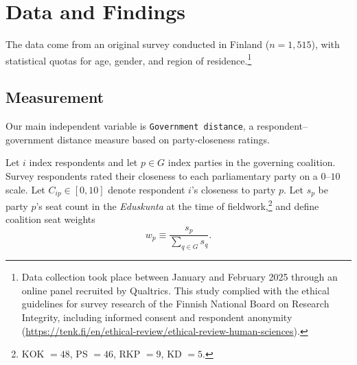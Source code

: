 \documentclass[11pt]{article}\usepackage[]{graphicx}\usepackage[]{xcolor}
\begin{document}


\section{Data and Findings}

The data come from an original survey conducted in Finland ($n = 1,515$), with statistical quotas for age, gender, and region of residence.\footnote{Data collection took place between January and February 2025 through an online panel recruited by Qualtrics. This study complied with the ethical guidelines for survey research of the Finnish National Board on Research Integrity, including informed consent and respondent anonymity (\url{https://tenk.fi/en/ethical-review/ethical-review-human-sciences}).}


\subsection{Measurement}

Our main independent variable is \texttt{Government distance}, a respondent--government distance measure based on party-closeness ratings.

Let $i$ index respondents and let $p \in G$ index parties in the governing coalition. Survey respondents rated their closeness to each parliamentary party on a $0$--$10$ scale. Let $C_{ip} \in [0,10]$ denote respondent $i$'s closeness to party $p$. Let $s_p$ be party $p$'s seat count in the \emph{Eduskunta} at the time of fieldwork,\footnote{KOK $=48$, PS $=46$, RKP $=9$, KD $=5$.} and define coalition seat weights
\begin{equation}
w_p \equiv \frac{s_p}{\sum_{q \in G} s_q}.
\label{eq:weights}
\end{equation}
\end{document}
